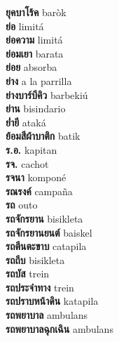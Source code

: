\textbf{ ยุคบาโร้ค  } baròk \\
\textbf{ ย่อ  } limitá \\
\textbf{ ย่อความ  } limitá \\
\textbf{ ย่อมเยา  } barata \\
\textbf{ ย่อย  } absorba \\
\textbf{ ย่าง  } a la parrilla \\
\textbf{ ย่างบาร์บีคิว  } barbekiú \\
\textbf{ ย่าน  } bisindario \\
\textbf{ ย่ำยี  } ataká \\
\textbf{ ย้อมสีผ้าบาติก  } batik \\
\textbf{ ร.อ.  } kapitan \\
\textbf{ รจ.  } cachot \\
\textbf{ รจนา  } komponé \\
\textbf{ รณรงค์  } campaña \\
\textbf{ รถ  } outo \\
\textbf{ รถจักรยาน  } bisikleta \\
\textbf{ รถจักรยานยนต์  } baiskel \\
\textbf{ รถตีนตะขาบ  } catapila \\
\textbf{ รถถีบ  } bisikleta \\
\textbf{ รถบัส  } trein \\
\textbf{ รถประจำทาง  } trein \\
\textbf{ รถปราบหน้าดิน  } katapila \\
\textbf{ รถพยาบาล  } ambulans \\
\textbf{ รถพยาบาลฉุกเฉิน  } ambulans \\

